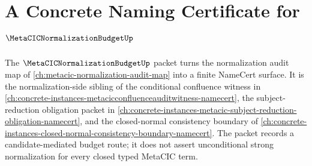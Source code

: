 \chapter{A Concrete Naming Certificate for $\MetaCICNormalizationBudgetUp$}
\label{ch:concrete-instances-metacicnormalizationbudget-namecert}

The $\MetaCICNormalizationBudgetUp$ packet turns the normalization audit map of \autoref{ch:metacic-normalization-audit-map} into a finite NameCert surface. It is the normalization-side sibling of the conditional confluence witness in \autoref{ch:concrete-instances-metacicconfluenceauditwitness-namecert}, the subject-reduction obligation packet in \autoref{ch:concrete-instances-metacic-subject-reduction-obligation-namecert}, and the closed-normal consistency boundary of \autoref{ch:concrete-instances-closed-normal-consistency-boundary-namecert}. The packet records a candidate-mediated budget route; it does not assert unconditional strong normalization for every closed typed MetaCIC term.

